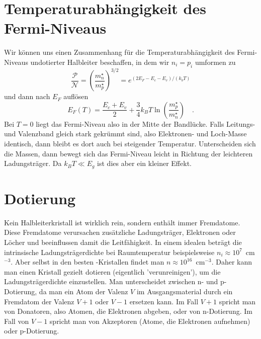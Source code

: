 \section{Temperaturabhängigkeit des Fermi-Niveaus}

Wir können uns einen Zusammenhang für die Temperaturabhängigkeit des Fermi-Niveaus   undotierter Halbleiter beschaffen, in dem wir $n_i = p_i$ umformen zu
\begin{equation}
    \frac{\mathcal{P}}{\mathcal{N}} = \left( \frac{m^\star_n}{m^\star_p} \right)^{3/2} = e^{(2 E_F - E_c - E_v)/(k_b T)}
\end{equation}
und dann nach $E_F$ auflösen
\begin{equation}
    E_F(T) = \frac{E_c + E_v}{2} + \frac{3}{4} k_B T \ln \left( \frac{m^\star_p}{m^\star_n} \right) \quad . \label{eq:5_Efermi_intr}
\end{equation}
Bei $T=0$ liegt das Fermi-Niveau also in der Mitte der Bandlücke. Falls Leitungs- und Valenzband gleich stark gekrümmt sind, also Elektronen- und Loch-Masse identisch, dann bleibt es dort auch bei steigender Temperatur. Unterscheiden sich die Massen, dann bewegt sich das Fermi-Niveau leicht in Richtung der leichteren Ladungsträger. Da $k_B T \ll E_g$ ist dies aber ein kleiner Effekt.


\section{Dotierung}

Kein Halbleiterkristall ist wirklich rein, sondern enthält immer Fremdatome. Diese Fremdatome verursachen zusätzliche Ladungsträger, Elektronen oder Löcher und beeinflussen damit die Leitfähigkeit. In einem idealen  beträgt die intrinsische Ladungsträgerdichte bei Raumtemperatur beispielsweise $n_i \approx 10^7$~cm$^{-3}$. Aber selbst in den besten -Kristallen findet man $n \approx 10^{16}$~cm$^{-3}$. Daher kann man einen Kristall gezielt dotieren (eigentlich 'verunreinigen'), um die Ladungsträgerdichte einzustellen. Man unterscheidet zwischen n- und p-Dotierung, da man ein Atom der Valenz $V$ im Ausgangsmaterial durch ein Fremdatom der Valenz $V+1$ oder $V-1$ ersetzen kann. Im Fall $V+1$ spricht man von Donatoren, also Atomen, die Elektronen abgeben, oder von n-Dotierung. Im Fall von $V-1$ spricht man von Akzeptoren (Atome, die Elektronen aufnehmen) oder p-Dotierung.


